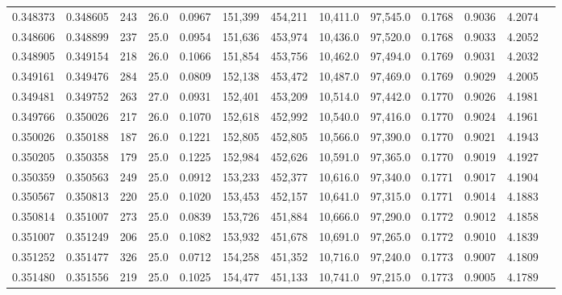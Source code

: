 \begin{tabular}{rrrrrrrrrrrrr}
0.348373 & 0.348605 &   243 & 26.0 &                                     0.0967 & 151,399 & 454,211 &  10,411.0 &  97,545.0 & 0.1768 & 0.9036 & 4.2074 \\
0.348606 & 0.348899 &   237 & 25.0 &                                     0.0954 & 151,636 & 453,974 &  10,436.0 &  97,520.0 & 0.1768 & 0.9033 & 4.2052 \\
0.348905 & 0.349154 &   218 & 26.0 &                                     0.1066 & 151,854 & 453,756 &  10,462.0 &  97,494.0 & 0.1769 & 0.9031 & 4.2032 \\
0.349161 & 0.349476 &   284 & 25.0 &                                     0.0809 & 152,138 & 453,472 &  10,487.0 &  97,469.0 & 0.1769 & 0.9029 & 4.2005 \\
0.349481 & 0.349752 &   263 & 27.0 &                                     0.0931 & 152,401 & 453,209 &  10,514.0 &  97,442.0 & 0.1770 & 0.9026 & 4.1981 \\
0.349766 & 0.350026 &   217 & 26.0 &                                     0.1070 & 152,618 & 452,992 &  10,540.0 &  97,416.0 & 0.1770 & 0.9024 & 4.1961 \\
0.350026 & 0.350188 &   187 & 26.0 &                                     0.1221 & 152,805 & 452,805 &  10,566.0 &  97,390.0 & 0.1770 & 0.9021 & 4.1943 \\
0.350205 & 0.350358 &   179 & 25.0 &                                     0.1225 & 152,984 & 452,626 &  10,591.0 &  97,365.0 & 0.1770 & 0.9019 & 4.1927 \\
0.350359 & 0.350563 &   249 & 25.0 &                                     0.0912 & 153,233 & 452,377 &  10,616.0 &  97,340.0 & 0.1771 & 0.9017 & 4.1904 \\
0.350567 & 0.350813 &   220 & 25.0 &                                     0.1020 & 153,453 & 452,157 &  10,641.0 &  97,315.0 & 0.1771 & 0.9014 & 4.1883 \\
0.350814 & 0.351007 &   273 & 25.0 &                                     0.0839 & 153,726 & 451,884 &  10,666.0 &  97,290.0 & 0.1772 & 0.9012 & 4.1858 \\
0.351007 & 0.351249 &   206 & 25.0 &                                     0.1082 & 153,932 & 451,678 &  10,691.0 &  97,265.0 & 0.1772 & 0.9010 & 4.1839 \\
0.351252 & 0.351477 &   326 & 25.0 &                                     0.0712 & 154,258 & 451,352 &  10,716.0 &  97,240.0 & 0.1773 & 0.9007 & 4.1809 \\
0.351480 & 0.351556 &   219 & 25.0 &                                     0.1025 & 154,477 & 451,133 &  10,741.0 &  97,215.0 & 0.1773 & 0.9005 & 4.1789 \\

\end{tabular}
